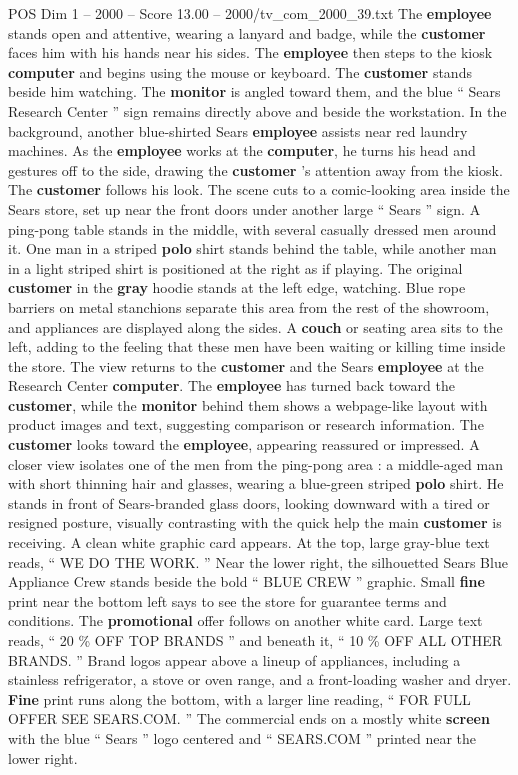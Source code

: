 \begin{textsample}{POS Dim 1 – 2000 – Score 13.00 – 2000/tv\_com\_2000\_39.txt}
The \textbf{employee} stands open and attentive, wearing a lanyard and badge, while the \textbf{customer} faces him with his hands near his sides.
The \textbf{employee} then steps to the kiosk \textbf{computer} and begins using the mouse or keyboard.
The \textbf{customer} stands beside him watching.
The \textbf{monitor} is angled toward them, and the blue “ Sears Research Center ” sign remains directly above and beside the workstation.
In the background, another blue-shirted Sears \textbf{employee} assists near red laundry machines.
As the \textbf{employee} works at the \textbf{computer}, he turns his head and gestures off to the side, drawing the \textbf{customer} ’s attention away from the kiosk.
The \textbf{customer} follows his look.
The scene cuts to a comic-looking area inside the Sears store, set up near the front doors under another large “ Sears ” sign.
A ping-pong table stands in the middle, with several casually dressed men around it.
One man in a striped \textbf{polo} shirt stands behind the table, while another man in a light striped shirt is positioned at the right as if playing.
The original \textbf{customer} in the \textbf{gray} hoodie stands at the left edge, watching.
Blue rope barriers on metal stanchions separate this area from the rest of the showroom, and appliances are displayed along the sides.
A \textbf{couch} or seating area sits to the left, adding to the feeling that these men have been waiting or killing time inside the store.
The view returns to the \textbf{customer} and the Sears \textbf{employee} at the Research Center \textbf{computer}.
The \textbf{employee} has turned back toward the \textbf{customer}, while the \textbf{monitor} behind them shows a webpage-like layout with product images and text, suggesting comparison or research information.
The \textbf{customer} looks toward the \textbf{employee}, appearing reassured or impressed.
A closer view isolates one of the men from the ping-pong area : a middle-aged man with short thinning hair and glasses, wearing a blue-green striped \textbf{polo} shirt.
He stands in front of Sears-branded glass doors, looking downward with a tired or resigned posture, visually contrasting with the quick help the main \textbf{customer} is receiving.
A clean white graphic card appears.
At the top, large gray-blue text reads, “ WE DO THE WORK. ” Near the lower right, the silhouetted Sears Blue Appliance Crew stands beside the bold “ BLUE CREW ” graphic.
Small \textbf{fine} print near the bottom left says to see the store for guarantee terms and conditions.
The \textbf{promotional} offer follows on another white card.
Large text reads, “ 20 \% OFF TOP BRANDS ” and beneath it, “ 10 \% OFF ALL OTHER BRANDS. ” Brand logos appear above a lineup of appliances, including a stainless refrigerator, a stove or oven range, and a front-loading washer and dryer. \textbf{Fine} print runs along the bottom, with a larger line reading, “ FOR FULL OFFER SEE SEARS.COM. ” The commercial ends on a mostly white \textbf{screen} with the blue “ Sears ” logo centered and “ SEARS.COM ” printed near the lower right.

\end{textsample}
